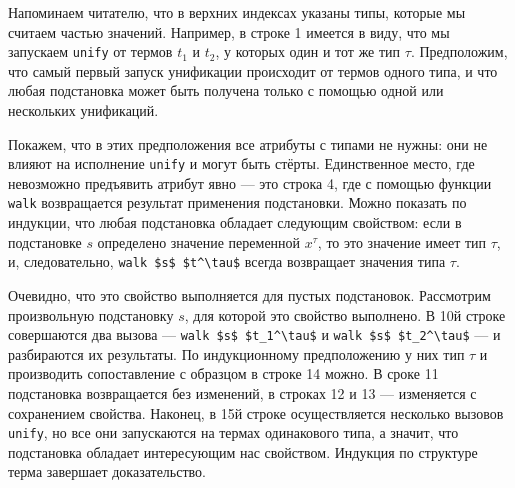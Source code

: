 \noindent Напоминаем читателю, что в верхних индексах указаны типы, которые мы считаем частью значений.
Например, в строке 1 имеется в виду, что мы запускаем \lstinline|unify|
от термов $t_1$ и $t_2$, у которых один и тот же тип $\tau$. Предположим, что самый первый запуск унификации происходит от термов одного типа, и что любая подстановка может быть получена только с помощью одной или нескольких унификаций.


Покажем, что в этих предположения все атрибуты с типами не нужны: они не влияют на исполнение  \lstinline|unify| и могут быть стёрты.
Единственное место, где невозможно предъявить атрибут явно --- это строка 4, где с помощью функции  \lstinline|walk| возвращается результат применения подстановки.
Можно показать по индукции, что любая подстановка обладает следующим свойством: если в  подстановке $s$ определено значение переменной $x^\tau$, то это значение имеет тип $\tau$, и, следовательно,  \lstinline|walk $s$ $t^\tau$| всегда возвращает значения типа  $\tau$.


Очевидно, что это свойство  выполняется для пустых подстановок.
Рассмотрим произвольную подстановку $s$, для которой это свойство выполнено. В 10й строке совершаются два вызова ---
\lstinline|walk $s$ $t_1^\tau$| и \lstinline|walk $s$ $t_2^\tau$| --- и разбираются их результаты.
По индукционному предположению у них тип $\tau$ и производить сопоставление с образцом в строке 14 можно.
В сроке 11 подстановка возвращается без изменений, в строках 12 и 13 --- изменяется с сохранением свойства.
Наконец, в 15й строке осуществляется несколько вызовов \lstinline|unify|, но все они запускаются на термах одинакового типа, а значит, что подстановка обладает интересующим нас свойством. Индукция по структуре терма завершает доказательство.

